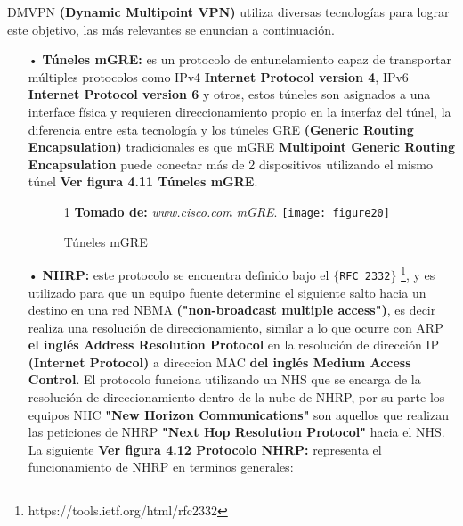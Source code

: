 DMVPN \textbf{(Dynamic Multipoint VPN)} utiliza diversas tecnologías para lograr este objetivo, las más relevantes se enuncian a continuación.
\begin{itemize}
\item[•]\textbf{Túneles mGRE:} es un protocolo de entunelamiento capaz de transportar múltiples protocolos como IPv4 \textbf{Internet Protocol version 4}, IPv6 \textbf{Internet Protocol version 6} y otros, estos túneles son asignados a una interface física y requieren direccionamiento propio en la interfaz del túnel, la diferencia entre esta tecnología y los túneles GRE \textbf{(Generic Routing Encapsulation)} tradicionales es que mGRE \textbf{Multipoint Generic Routing Encapsulation} puede conectar más de 2 dispositivos utilizando el mismo túnel \textbf{Ver figura 4.11 Túneles mGRE}.
\begin{figure}[htbp]
\ref{fig:mgre} \textbf{Tomado de:} \textit{www.cisco.com mGRE}.
  \centering
    {\texttt{[image: figure20]}}%
  \caption{\footnotesize{Túneles mGRE}}
  \label{fig:mgre}
\end{figure}
\item[•]\textbf{NHRP:} este protocolo se encuentra definido bajo el \texttt{$\{$RFC 2332$\}$} 
\footnote{https://tools.ietf.org/html/rfc2332}, y es utilizado para que un equipo fuente determine el siguiente salto hacia un destino en una red NBMA \textbf{("non-broadcast multiple access")}, es decir realiza una resolución de direccionamiento, similar a lo que ocurre con ARP \textbf{el inglés Address Resolution Protocol} en la resolución de dirección IP \textbf{(Internet Protocol)} a direccion MAC \textbf{del inglés Medium Access Control}. El protocolo funciona utilizando un NHS  que se encarga de la resolución de direccionamiento dentro de la nube de NHRP, por su parte los equipos NHC \textbf{"New Horizon Communications"} son aquellos que realizan las peticiones de NHRP \textbf{"Next Hop Resolution Protocol"} hacia el NHS. La siguiente \textbf{Ver figura 4.12 Protocolo NHRP:} representa el funcionamiento de NHRP en terminos generales:


\end{itemize}
